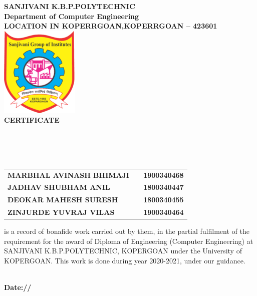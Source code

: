 \begin{center}
\thispagestyle{empty}

\Large{\textbf{\color{orange}SANJIVANI K.B.P.POLYTECHNIC  }} \\ 
\large{\textbf{Department of Computer Engineering}}\\
\large{\textbf{LOCATION IN KOPERRGOAN,KOPERRGOAN – 423601}}\\[0.5cm]

\includegraphics[scale=0.6]{project/images/kbp}\\[0.5cm]

{\Huge \textbf{\color{brown}CERTIFICATE}}\\[0.5cm]
\end{center}
\linespread{1.13}
\large{\\[0.2cm]
\textbf{\Large{}}\\[0.2cm]
\\[0.3cm]
\begin{table}[h]
\centering
\large{
\begin{tabular}{>{\bfseries}lc>{\bfseries}r}
MARBHAL AVINASH BHIMAJI & & 1900340468\\JADHAV SHUBHAM ANIL & & 1800340447\\DEOKAR MAHESH SURESH & &  1800340455\\ZINJURDE YUVRAJ VILAS & &  1900340464\\
\end{tabular}}
\end{table}
 is a record of bonafide work carried out by them, in the partial
 fulfilment of the requirement for the award of Diploma of
 Engineering (Computer Engineering) at SANJIVANI K.B.P.POLYTECHNIC, KOPERGOAN under the 
 University of KOPERGOAN. This work is done
 during year 2020-2021, under our guidance.}\\[0.5cm]
\large{\textbf{Date:\hspace*{1.0cm}/\hspace*{1.0cm}/}}\\
